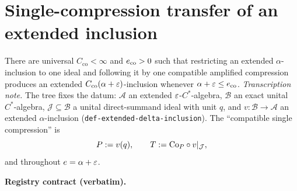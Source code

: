 \section{Single-compression transfer of an extended inclusion}\label{sec:compcb-single-compression-transfer}

\begin{lemma}\label{lem:compcb-single-compression-transfer}
There are universal $C_{\mathrm{co}}<\infty$ and $e_{\mathrm{co}}>0$ such that
restricting an extended $\alpha$-inclusion to one ideal and following it by one compatible
amplified compression produces an extended $C_{\mathrm{co}}(\alpha+\varepsilon)$-inclusion
whenever $\alpha+\varepsilon\le e_{\mathrm{co}}$.
\emph{Transcription note.} The tree fixes the datum: $\mathcal A$ an extended
$\varepsilon$-$C^*$-algebra, $\mathcal B$ an exact unital $C^*$-algebra, $\mathcal J\subseteq
\mathcal B$ a unital direct-summand ideal with unit $q$, and
$v:\mathcal B\to\mathcal A$ an extended $\alpha$-inclusion
(\texttt{def-extended-delta-inclusion}). The ``compatible single compression'' is
\[
  P:=v(q),\qquad T:=\mathrm{Co}_{P}\circ v|_{\mathcal J},
\]
and throughout $e=\alpha+\varepsilon$.
\end{lemma}

\noindent\textbf{Registry contract (verbatim).}


